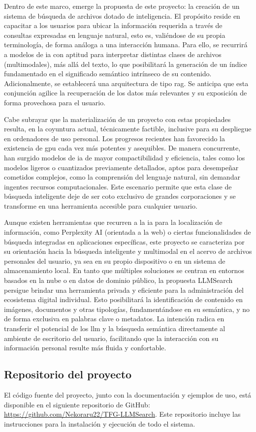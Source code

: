 Dentro de este marco, emerge la propuesta de este proyecto: la creación de un sistema de búsqueda de archivos dotado de inteligencia. El propósito reside en capacitar a los usuarios para ubicar la información requerida a través de consultas expresadas en lenguaje natural, esto es, valiéndose de su propia terminología, de forma análoga a una interacción humana. Para ello, se recurrirá a modelos de \gls{ia} con aptitud para interpretar distintas clases de archivos (multimodales), más allá del texto, lo que posibilitará la generación de un índice fundamentado en el significado semántico intrínseco de su contenido. Adicionalmente, se establecerá una arquitectura de tipo \gls{rag}. Se anticipa que esta conjunción agilice la recuperación de los datos más relevantes y su exposición de forma provechosa para el usuario.

Cabe subrayar que la materialización de un proyecto con estas propiedades resulta, en la coyuntura actual, técnicamente factible, inclusive para su despliegue en ordenadores de uso personal. Los progresos recientes han favorecido la existencia de \gls{gpu} cada vez más potentes y asequibles. De manera concurrente, han surgido modelos de \gls{ia} de mayor compactibilidad y eficiencia, tales como los modelos ligeros o cuantizados previamente detallados, aptos para desempeñar cometidos complejos, como la comprensión del lenguaje natural, sin demandar ingentes recursos computacionales. Este escenario permite que esta clase de búsqueda inteligente deje de ser coto exclusivo de grandes corporaciones y se transforme en una herramienta accesible para cualquier usuario.

Aunque existen herramientas que recurren a la \gls{ia} para la localización de información, como Perplexity AI (orientada a la web) o ciertas funcionalidades de búsqueda integradas en aplicaciones específicas, este proyecto se caracteriza por su orientación hacia la búsqueda inteligente y multimodal en el acervo de archivos personales del usuario, ya sea en su propio dispositivo o en un sistema de almacenamiento local. En tanto que múltiples soluciones se centran en entornos basados en la nube o en datos de dominio público, la propuesta LLMSearch persigue brindar una herramienta privada y eficiente para la administración del ecosistema digital individual. Esto posibilitará la identificación de contenido en imágenes, documentos y otras tipologías, fundamentándose en su semántica, y no de forma exclusiva en palabras clave o metadatos. La intención radica en transferir el potencial de los \gls{llm} y la búsqueda semántica directamente al ambiente de escritorio del usuario, facilitando que la interacción con su información personal resulte más fluida y confortable.

\subsection{Repositorio del proyecto}
El código fuente del proyecto, junto con la documentación y ejemplos de uso, está disponible en el siguiente repositorio de GitHub: \url{https://github.com/Nekoraru22/TFG-LLMSearch}. Este repositorio incluye las instrucciones para la instalación y ejecución de todo el sistema.